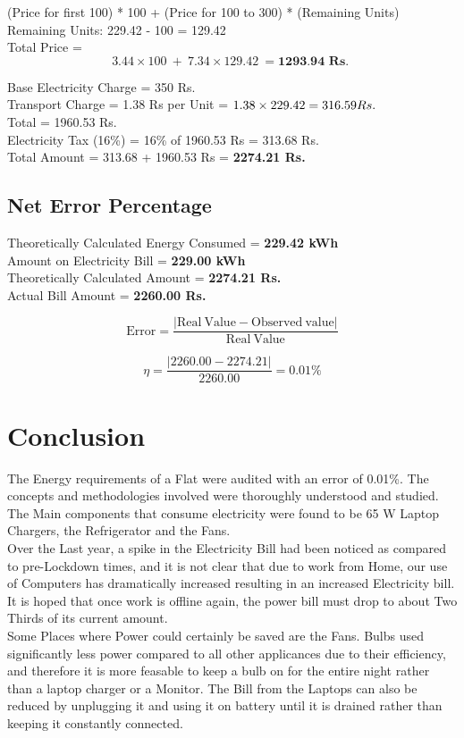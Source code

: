 \documentclass[11pt,a4paper]{article}
\begin{document}
(Price for first 100) * 100 + (Price for 100 to 300) * (Remaining Units)\\

\noindent
Remaining Units: 229.42 - 100 = 129.42\\
Total Price = 
$$
3.44 \times 100\ +\  7.34 \times 129.42\ = \textbf{1293.94 Rs. }
$$

\noindent
Base Electricity Charge \hfill = 350 Rs.\\
Transport Charge 		= 1.38 Rs per Unit = $ 1.38 \times 229.42  \hfill= 316.59 Rs. $\\
Total 					\hfill= 1960.53 Rs.\\
Electricity Tax (16\%)	= 16\% of 1960.53 Rs \hfill= 313.68 Rs.\\
Total Amount 			= 313.68 + 1960.53 Rs \hfill= \textbf{2274.21 Rs. }
						
\subsection{Net Error Percentage}
Theoretically Calculated Energy Consumed 	\hfill= \textbf{229.42 kWh}\\
Amount on Electricity Bill 					\hfill= \textbf{229.00 kWh}\\

\noindent
Theoretically Calculated Amount	\hfill= \textbf{2274.21 Rs. }\\
Actual Bill Amount				\hfill= \textbf{2260.00 Rs. }

$$ \mathrm{Error} = \dfrac{|\mathrm{Real\ Value} - \mathrm{Observed\ value}|}{\mathrm{Real\ Value}}$$

$$\eta = \frac{|2260.00 - 2274.21|}{2260.00} = 0.01 \%$$

\section{Conclusion}

The Energy requirements of a Flat were audited with an error of 0.01\%. The concepts and methodologies involved were thoroughly understood and studied. The Main components that consume electricity were found to be 65 W Laptop Chargers, the Refrigerator and the Fans.\\

Over the Last year, a spike in the Electricity Bill had been noticed as compared to pre-Lockdown times, and it is not clear that due to work from Home, our use of Computers has dramatically increased resulting in an increased Electricity bill. It is hoped that once work is offline again, the power bill must drop to about Two Thirds of its current amount. \\

Some Places where Power could certainly be saved are the Fans. Bulbs used significantly less power compared to all other applicances due to their efficiency, and therefore it is more feasable to keep a bulb on for the entire night rather than a laptop charger or a Monitor. The Bill from the Laptops can also be reduced by unplugging it and using it on battery until it is drained rather than keeping it constantly connected. 
\end{document}
